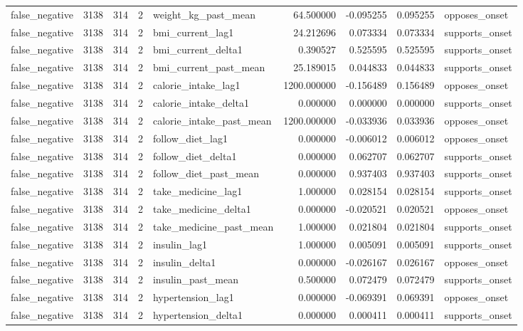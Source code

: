 \begin{longtable}{lrrrlrrrl}
false\_negative & 3138 & 314 & 2 & weight\_kg\_past\_mean & 64.500000 & -0.095255 & 0.095255 & opposes\_onset \\
false\_negative & 3138 & 314 & 2 & bmi\_current\_lag1 & 24.212696 & 0.073334 & 0.073334 & supports\_onset \\
false\_negative & 3138 & 314 & 2 & bmi\_current\_delta1 & 0.390527 & 0.525595 & 0.525595 & supports\_onset \\
false\_negative & 3138 & 314 & 2 & bmi\_current\_past\_mean & 25.189015 & 0.044833 & 0.044833 & supports\_onset \\
false\_negative & 3138 & 314 & 2 & calorie\_intake\_lag1 & 1200.000000 & -0.156489 & 0.156489 & opposes\_onset \\
false\_negative & 3138 & 314 & 2 & calorie\_intake\_delta1 & 0.000000 & 0.000000 & 0.000000 & supports\_onset \\
false\_negative & 3138 & 314 & 2 & calorie\_intake\_past\_mean & 1200.000000 & -0.033936 & 0.033936 & opposes\_onset \\
false\_negative & 3138 & 314 & 2 & follow\_diet\_lag1 & 0.000000 & -0.006012 & 0.006012 & opposes\_onset \\
false\_negative & 3138 & 314 & 2 & follow\_diet\_delta1 & 0.000000 & 0.062707 & 0.062707 & supports\_onset \\
false\_negative & 3138 & 314 & 2 & follow\_diet\_past\_mean & 0.000000 & 0.937403 & 0.937403 & supports\_onset \\
false\_negative & 3138 & 314 & 2 & take\_medicine\_lag1 & 1.000000 & 0.028154 & 0.028154 & supports\_onset \\
false\_negative & 3138 & 314 & 2 & take\_medicine\_delta1 & 0.000000 & -0.020521 & 0.020521 & opposes\_onset \\
false\_negative & 3138 & 314 & 2 & take\_medicine\_past\_mean & 1.000000 & 0.021804 & 0.021804 & supports\_onset \\
false\_negative & 3138 & 314 & 2 & insulin\_lag1 & 1.000000 & 0.005091 & 0.005091 & supports\_onset \\
false\_negative & 3138 & 314 & 2 & insulin\_delta1 & 0.000000 & -0.026167 & 0.026167 & opposes\_onset \\
false\_negative & 3138 & 314 & 2 & insulin\_past\_mean & 0.500000 & 0.072479 & 0.072479 & supports\_onset \\
false\_negative & 3138 & 314 & 2 & hypertension\_lag1 & 0.000000 & -0.069391 & 0.069391 & opposes\_onset \\
false\_negative & 3138 & 314 & 2 & hypertension\_delta1 & 0.000000 & 0.000411 & 0.000411 & supports\_onset \\

\end{longtable}
